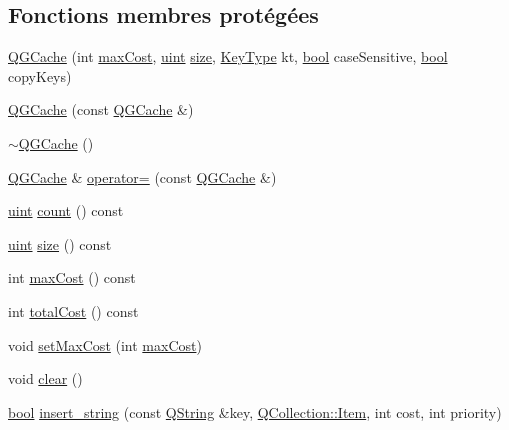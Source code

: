 \subsection*{Fonctions membres protégées}
\begin{DoxyCompactItemize}
\item 
\hyperlink{class_q_g_cache_a993236be98f96a207a872b3990db0be7}{Q\+G\+Cache} (int \hyperlink{class_q_g_cache_a9cae2408617b643d01ac9818013e784a}{max\+Cost}, \hyperlink{qglobal_8h_a4d3943ddea65db7163a58e6c7e8df95a}{uint} \hyperlink{class_q_g_cache_ac14bb53df3baf244dbe5bccbee87dc7c}{size}, \hyperlink{class_q_g_cache_a1dcb303ef4795be3117374c386c5574a}{Key\+Type} kt, \hyperlink{qglobal_8h_a1062901a7428fdd9c7f180f5e01ea056}{bool} case\+Sensitive, \hyperlink{qglobal_8h_a1062901a7428fdd9c7f180f5e01ea056}{bool} copy\+Keys)
\item 
\hyperlink{class_q_g_cache_ac99ee21a13fa085b60012717c3bfd3e4}{Q\+G\+Cache} (const \hyperlink{class_q_g_cache}{Q\+G\+Cache} \&)
\item 
\hyperlink{class_q_g_cache_abe3d03e77dc54bb4dc1b872a4a83cd46}{$\sim$\+Q\+G\+Cache} ()
\item 
\hyperlink{class_q_g_cache}{Q\+G\+Cache} \& \hyperlink{class_q_g_cache_aa58dc5bf77c3846e89cc46f0124bc6fc}{operator=} (const \hyperlink{class_q_g_cache}{Q\+G\+Cache} \&)
\item 
\hyperlink{qglobal_8h_a4d3943ddea65db7163a58e6c7e8df95a}{uint} \hyperlink{class_q_g_cache_a876e0b62df6e993a49d0afc496d53732}{count} () const 
\item 
\hyperlink{qglobal_8h_a4d3943ddea65db7163a58e6c7e8df95a}{uint} \hyperlink{class_q_g_cache_ac14bb53df3baf244dbe5bccbee87dc7c}{size} () const 
\item 
int \hyperlink{class_q_g_cache_a9cae2408617b643d01ac9818013e784a}{max\+Cost} () const 
\item 
int \hyperlink{class_q_g_cache_aac0647ab4473a766a7663aafb8599a82}{total\+Cost} () const 
\item 
void \hyperlink{class_q_g_cache_ac168417e27bd435675361b710692e7a8}{set\+Max\+Cost} (int \hyperlink{class_q_g_cache_a9cae2408617b643d01ac9818013e784a}{max\+Cost})
\item 
void \hyperlink{class_q_g_cache_a3e0d8ce359e64a8793ef7f9d79dc546b}{clear} ()
\item 
\hyperlink{qglobal_8h_a1062901a7428fdd9c7f180f5e01ea056}{bool} \hyperlink{class_q_g_cache_a115d46416492c26746ed3f1e6b4ae9f6}{insert\+\_\+string} (const \hyperlink{class_q_string}{Q\+String} \&key, \hyperlink{class_q_collection_ac6f3ddbf999e31fb797927f71ae6b5d7}{Q\+Collection\+::\+Item}, int cost, int priority)

\end{DoxyCompactItemize}
